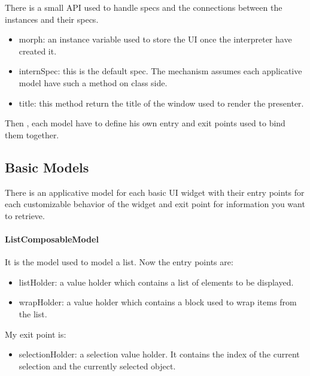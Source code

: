 \documentclass[a4paper,10pt,twoside]{book}
\begin{document}
There is a small API used to handle specs and the connections between the instances and their specs.

\begin{itemize}
	\item morph: an instance variable used to store the UI once the interpreter have created it.
	\item internSpec: this is the default spec. The mechanism assumes each applicative model have such a method on class side.
	\item title: this method return the title of the window used to render the presenter.
\end{itemize}

Then , each model have to define his own entry and exit points used to bind them together.

\subsection{Basic Models}

There is an applicative model for each basic UI widget  with their entry points for each customizable behavior of the widget and exit point for information you want to retrieve.  

\paragraph{ListComposableModel} It is the model used to model a list.
Now the entry points are:
\begin{itemize}
	\item listHolder: a value holder which contains a list of elements to be displayed.
	\item wrapHolder: a value holder which contains a block used to wrap items from the list.
\end{itemize}
My exit point is:
\begin{itemize}
	\item selectionHolder: a selection value holder. It contains the index of the current selection and the currently selected object.
\end{itemize}
\end{document}
